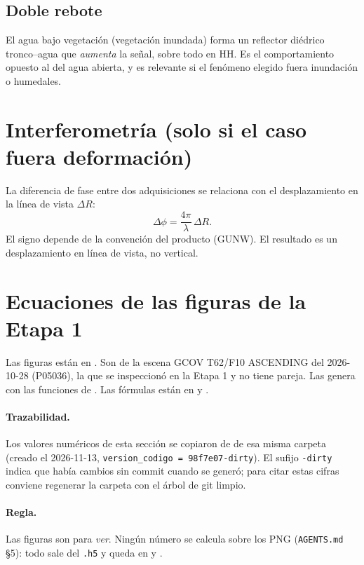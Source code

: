 \documentclass[11pt,a4paper]{article}
\begin{document}
\subsection{Doble rebote}
El agua bajo vegetación (vegetación inundada) forma un reflector diédrico tronco--agua que
\emph{aumenta} la señal, sobre todo en HH. Es el comportamiento opuesto al del agua abierta, y es
relevante si el fenómeno elegido fuera inundación o humedales.

\section{Interferometría (solo si el caso fuera deformación)}

La diferencia de fase entre dos adquisiciones se relaciona con el desplazamiento en la línea de
vista $\Delta R$:
\begin{equation}
  \Delta\phi = \frac{4\pi}{\lambda}\, \Delta R .
\end{equation}
El signo depende de la convención del producto (GUNW). El resultado es un desplazamiento en línea
de vista, no vertical.

\section{Ecuaciones de las figuras de la Etapa 1}
\label{sec:figuras}

Las figuras están en
.
Son de la escena GCOV T62/F10 ASCENDING del 2026-10-28 (P05036), la que se inspeccionó en la Etapa 1 y no tiene pareja. Las genera
 con las funciones de . Las fórmulas están en
 y .

\paragraph{Trazabilidad.} Los valores numéricos de esta sección se copiaron de  de esa misma carpeta (creado el
2026-11-13, \texttt{version\_codigo = 98f7e07-dirty}). El sufijo \texttt{-dirty} indica que había cambios sin commit cuando se generó;
para citar estas cifras conviene regenerar la carpeta con el árbol de git limpio.

\paragraph{Regla.} Las figuras son para \emph{ver}. Ningún número se calcula sobre los PNG (\texttt{AGENTS.md} §5): todo sale del
\texttt{.h5} y queda en  y .
\end{document}
